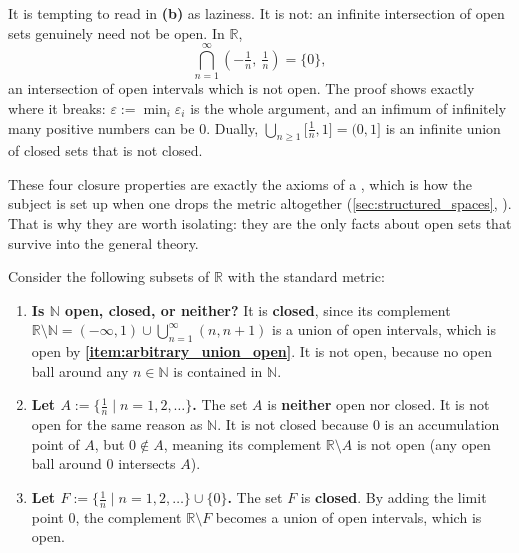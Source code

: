 \begin{importantremark}
\label{rem:finiteness_is_necessary}
It is tempting to read  in \textbf{(b)} as laziness. It is not: an infinite
intersection of open sets genuinely need not be open. In $\mathbb{R}$,
\[\bigcap_{n=1}^{\infty}\left(-\tfrac1n,\ \tfrac1n\right) = \{0\},\]
an intersection of open intervals which is not open. The proof shows exactly where it breaks:
$\varepsilon := \min_i\varepsilon_i$ is the whole argument, and an infimum of infinitely many
positive numbers can be $0$. Dually, $\bigcup_{n\geq1}\big[\tfrac1n,1\big] = (0,1]$ is an
infinite union of closed sets that is not closed.

\begin{ainote}
These four closure properties are exactly the axioms of a , which is how the
subject is set up when one drops the metric altogether (\cref{sec:structured_spaces},
). That is why they are worth isolating: they are the only facts about open
sets that survive into the general theory.
\end{ainote}
\end{importantremark}

\begin{example}
\label{ex:open_closed_R}
Consider the following subsets of $\mathbb{R}$ with the standard metric:
\begin{enumerate}[label=\textbf{(\alph*)}]
  \item \textbf{Is $\mathbb{N}$ open, closed, or neither?} It is \textbf{closed}, since its
    complement $\mathbb{R} \setminus \mathbb{N} = (-\infty, 1) \cup \bigcup_{n=1}^\infty (n, n+1)$
    is a union of open intervals, which is open by
    \textbf{\ref{item:arbitrary_union_open}}. It is not open,
    because no open ball around any $n \in \mathbb{N}$ is contained in $\mathbb{N}$.
  \item \textbf{Let $A := \{\frac{1}{n} \mid n = 1, 2, \dots\}$.} The set $A$ is \textbf{neither}
    open nor closed. It is not open for the same reason as $\mathbb{N}$. It is not closed because
    $0$ is an accumulation point of $A$, but $0 \notin A$, meaning its complement
    $\mathbb{R} \setminus A$ is not open (any open ball around $0$ intersects $A$).
  \item \textbf{Let $F := \{\frac{1}{n} \mid n = 1, 2, \dots\} \cup \{0\}$.} The set $F$ is
    \textbf{closed}. By adding the limit point $0$, the complement $\mathbb{R} \setminus F$
    becomes a union of open intervals, which is open.
\end{enumerate}
\end{example}

